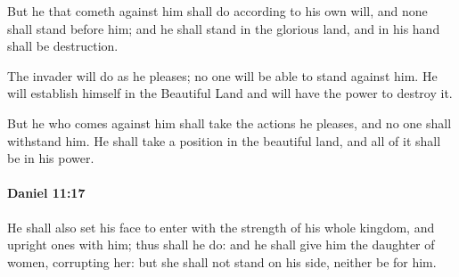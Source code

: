 			\begin{versebox}
					\item[BHS] 
					\item[LXX] 
					\item[ASV] But he that cometh against him shall do according to his own will, and none shall stand before him; and he shall stand in the glorious land, and in his hand shall be destruction.
					\item[NIV] The invader will do as he pleases; no one will be able to stand against him. He will establish himself in the Beautiful Land and will have the power to destroy it.
					\item[NRSV] But he who comes against him shall take the actions he pleases, and no one shall withstand him. He shall take a position in the beautiful land, and all of it shall be in his power.
			\end{versebox}

		\paragraph{Daniel 11:17} %
			\label{DANIEL-11-17}

			He shall also set his face to enter with the strength of his whole kingdom, and upright ones with him; thus shall he do: and he shall give him the daughter of women, corrupting her: but she shall not stand on his side, neither be for him.

